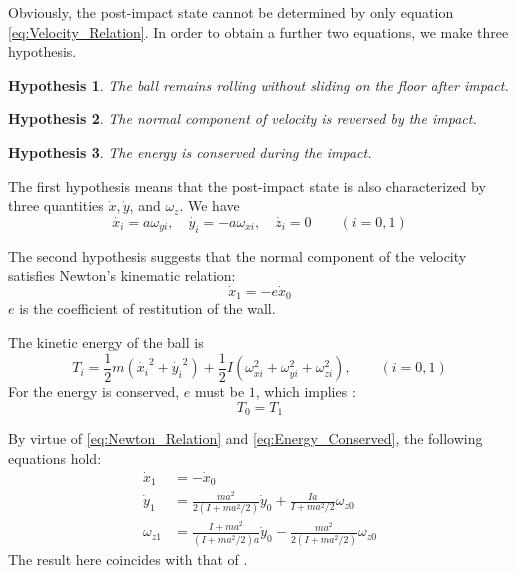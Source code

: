 \documentclass[preprint,12pt]{elsarticle}
\newtheorem{hypothesis}{Hypothesis}
\begin{document}
Obviously, the post-impact state cannot be determined by only equation \eqref{eq:Velocity_Relation}.
In order to obtain a further two equations, we make three hypothesis.
\begin{hypothesis}
  The ball remains rolling without sliding on the floor after impact.
\end{hypothesis}
\begin{hypothesis}
  The normal component of velocity is reversed by the impact.
\end{hypothesis}
\begin{hypothesis}
  The energy is conserved during the impact.
\end{hypothesis}

The first hypothesis means that the post-impact state is also characterized by three quantities $\dot{x}, \dot{y}$, and $\omega_z$.
We have
\begin{equation}
  \dot{x_i}= a\omega_{yi} ,\quad \dot{y_i} =- a\omega_{xi} ,\quad\dot{z_i} = 0\qquad (i=0,1)
\end{equation}

The second hypothesis suggests that the normal component of the velocity satisfies Newton's kinematic relation:
\begin{equation}\label{eq:Newton_Relation}
  \dot{x}_1=-e\dot{x}_0
\end{equation}
$e$ is the coefficient of restitution of the wall.

The kinetic energy of the ball is
\begin{equation}
  T_i=\frac{1}{2}m\left(\dot{x_i}^2+\dot{y_i}^2\right)+\frac{1}{2}I\left(\omega_{xi}^2+\omega_{yi}^2+\omega_{zi}^2\right),\qquad(i=0,1)
\end{equation}
For the energy is conserved, $e$ must be $1$, which implies :
\begin{equation}\label{eq:Energy_Conserved}
  T_0=T_1
\end{equation}

By virtue of \eqref{eq:Newton_Relation} and \eqref{eq:Energy_Conserved}, the following equations hold:
\begin{equation}\label{eq:State_Relation}
  \begin{split}
    \dot{x}_1&=-\dot{x}_0 \\
    \dot{y}_1&=\frac{m a^2}{2\left(I+m a^2/2\right)}\dot{y}_0+\frac{I a}{I+m a^2/2}\omega_{z0}\\
    \omega_{z1}&=\frac{I+m a^2}{\left(I+m a^2/2\right)a}\dot{y}_0-\frac{m a^2}{2\left(I+m a^2/2\right)}\omega_{z0}
  \end{split}
\end{equation}
The result here coincides with that of \cite{Treschev}.
\end{document}
